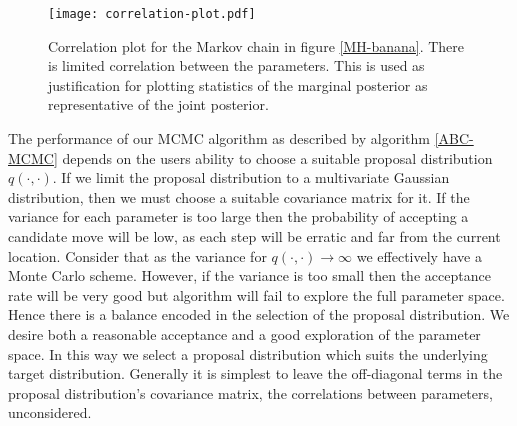 \begin{figure}[H]
	\centering
	\texttt{[image: correlation-plot.pdf]}
	\caption{Correlation plot for the Markov chain in figure \ref{MH-banana}. There is limited correlation between the parameters. This is used as justification for plotting statistics of the marginal posterior as representative of the joint posterior.}
	\label{correlation-plot}
\end{figure}


The performance of our MCMC algorithm as described by algorithm \ref{ABC-MCMC} depends on the users ability to choose a suitable proposal distribution $q(\cdot,\cdot)$. If we limit the proposal distribution to a multivariate Gaussian distribution, then we must choose a suitable covariance matrix for it. If the variance for each parameter is too large then the probability of accepting a candidate move will be low, as each step will be erratic and far from the current location. Consider that as the variance for $q(\cdot,\cdot) \rightarrow \infty$ we effectively have a Monte Carlo scheme. However, if the variance is too small then the acceptance rate will be very good but algorithm will fail to explore the full parameter space. Hence there is a balance encoded in the selection of the proposal distribution. We desire both a reasonable acceptance and a good exploration of the parameter space. In this way we select a proposal distribution which suits the underlying target distribution. Generally it is simplest to leave the off-diagonal terms in the proposal distribution's covariance matrix, the correlations between parameters, unconsidered.\\

